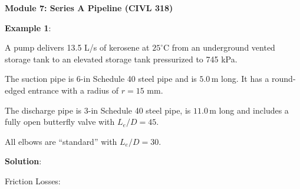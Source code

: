\documentclass[10pt]{amsart}
\begin{document}
\thispagestyle{empty}
\vspace{-7cm}
\centering

\textbf{\Large Module 7: Series A Pipeline (CIVL 318)}
\par\medskip



\raggedright

\begin{multicols}{2}




	\textbf{Example 1}:


	A pump delivers 13.5 L/s of kerosene at $25^\circ$C from an underground vented
	storage tank to an elevated storage tank pressurized to 745 kPa.
	\par
	The suction pipe is 6-in Schedule 40 steel pipe and is $5.0\,\text{m}$ long. It has a round-edged entrance with a radius
	of $r=15$ mm.
	\par
	The discharge pipe is 3-in Schedule 40 steel pipe,  is $11.0\,\text{m}$ long and includes a fully open butterfly valve
	with $L_e/D=45$.
	\par
	All elbows are ``standard'' with $L_e/D=30$.


	\textbf{Solution}:\parb
	\Large


	\vfill\columnbreak

	Friction Losses:\\


\end{multicols}
\end{document}
